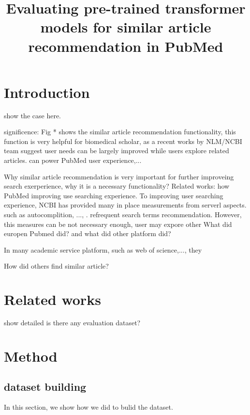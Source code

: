 \documentclass[11pt]{article}
\begin{document}
    \title{Evaluating pre-trained transformer models for similar article recommendation in PubMed}
    \maketitle

    \section{Introduction}

    show the case here.

    significence:
        Fig * shows the similar article recommendation functionality, this function is very helpful for biomedical scholar, as a recent works by NLM/NCBI team suggest user needs can be largely improved while users explore related articles.
        can power PubMed user experience,...

        Why similar article recommendation is very important for further improveing search exerperience, why it is a necessary functionality?
        Related works: how PubMed improving use searching experience. To improving user searching experience, NCBI has provided many in place measurements from serverl aspects.
        such as autocomplition, ..., \cite[]{}. refrequent search terms recommendation. However, this measures can be not necessary enough, user may expore other
    What did europen Pubmed did? and what did other platform did?

    In many academic service platform, such as web of science,..., they

    How did others find similar article?


    \section{Related works}

    show detailed is there any evaluation dataset?


    \section{Method}

    \subsection{dataset building}

    In this section, we show how we did to bulid the dataset.
\end{document}
